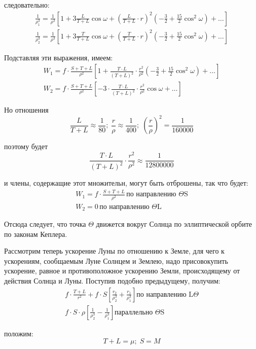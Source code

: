 \documentclass[a4paper,12pt]{article}
\begin{document}
следовательно:
\begin{equation*}
	\begin{aligned}
      \frac{1}{\rho_1 ^3} = \frac{1}{\rho^3} \left[ 1 + 3 \frac{L}{T+L} \cos \omega + \left( \frac{L}{T+L} \cdot r \right) ^2 \left(-\frac{3}{2} + \frac{15}{2} \cos^2 \omega \right) + \dots \right] \\
      \frac{1}{\rho_2 ^3} = \frac{1}{\rho^3} \left[ 1 + 3 \frac{T}{T+L} \cos \omega + \left( \frac{T}{T+L} \cdot r \right) ^2 \left(-\frac{3}{2} + \frac{15}{2} \cos^2 \omega \right) + \dots \right]
	\end{aligned}
\end{equation*}

Подставляя эти выражения, имеем:
\begin{equation*}
	\begin{aligned}
      W_1 = f \cdot \frac{S+T+L}{\rho^2} \left[ 1 + \frac{T \cdot L}{(T+L)^2} \cdot \frac{r^2}{\rho^2} \left( -\frac{3}{2} + \frac{15}{2} \cos^2 \omega \right) + \dots \right] \\
      W_2 = f \cdot \frac{S+T+L}{\rho^2} \left[ -3 \cdot \frac{T \cdot L}{(T+L)^2} \cdot \frac{r^2}{\rho^2} \cos \omega + \dots \right]
	\end{aligned}
\end{equation*}

Но отношения
\[ \frac{L}{T+L} \approx \frac{1}{80}; \; \frac{r}{\rho} \approx \frac{1}{400}; \; \left( \frac{r}{\rho} \right) ^2 = \frac{1}{160000}\]

поэтому будет
\[ \frac{T \cdot L}{(T+L)^2} \cdot \frac{r^2}{\rho ^2} \approx \frac{1}{12800000} \]

и члены, содержащие этот множительн, могут быть отброшены, так что будет:
\begin{equation*}
	\begin{aligned}
		W_1 = f \cdot \frac{S+T+L}{\rho^2} \, \text{по направлению $\Theta$S} \\
		W_2 = 0 \, \text{по направлению $\Theta$L}
	\end{aligned}
\end{equation*}

Отсюда следует, что точка $\Theta$ движется вокруг Солнца по эллиптической орбите по законам Кеплера.

Рассмотрим теперь ускорение Луны по отношению к Земле, для чего к ускорениям, сообщаемым Луне Солнцем и Землею, надо присовокупить ускорение, равное и противоположное ускорению Земли, происходящему от действия Солнца и Луны.
Поступив подобно предыдущему, получим:
\begin{equation*}
	\begin{aligned}
		f \cdot \frac{T+L}{r^2} + f \cdot S \left[ \frac{r_2}{\rho_2 ^3} + \frac{r_1}{\rho_1 ^3} \right] \text{по направлению L$\Theta$} \\
		f \cdot S \cdot \rho \left[ \frac{1}{\rho_2 ^3} - \frac{1}{\rho_1 ^3} \right] \text{параллельно $\Theta$S}
	\end{aligned}
\end{equation*}

положим:
\[ T+L = \mu; \; S = M\]

\listoffigures

\listoftables
\end{document}
